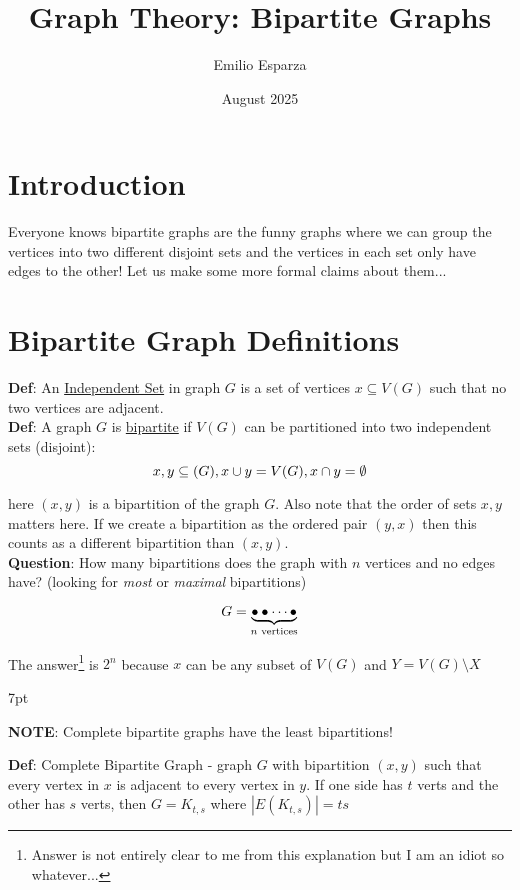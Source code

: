 \documentclass{article}
\title{Graph Theory: Bipartite Graphs}
\author{Emilio Esparza}
\date{August 2025}
\newenvironment{formal}{%
  \def\FrameCommand{%
    \hspace{1pt}%
    {\color{black}\vrule width 2pt}%
    {\color{formalshade}\vrule width 4pt}%
    \colorbox{formalshade}%
  }%
  \MakeFramed{\advance\hsize-\width\FrameRestore}%
  \noindent\hspace{-4.55pt}%
  \begin{adjustwidth}{}{7pt}%
  \vspace{2pt}\vspace{2pt}%
}
{%
  \vspace{2pt}\end{adjustwidth}\endMakeFramed%
}
\begin{document}
\maketitle

\section{Introduction}
Everyone knows bipartite graphs are the funny graphs where we can group the vertices into two different disjoint sets and the vertices in each set only have edges to the other! Let us make some more formal claims about them...

\section{Bipartite Graph Definitions}

\textbf{Def}: An \underline{Independent Set} in graph $G$ is a set of vertices $x \subseteq V(G)$ such that no two vertices are adjacent. \\

\noindent\textbf{Def}: A graph $G$ is \underline{bipartite} if $V(G)$ can be partitioned into two independent sets (disjoint):
$$x,y \subseteq (G), \space x \cup y = V(G), \space x \cap y = \emptyset$$

\noindent here $(x,y)$ is a bipartition of the graph $G$. Also note that the order of sets $x, y$ matters here. If we create a bipartition as the ordered pair $(y, x)$ then this counts as a different bipartition than $(x, y)$. \\


\noindent\textbf{Question}: How many bipartitions does the graph with $n$ vertices and no edges have? (looking for \emph{most} or \emph{maximal} bipartitions)

$$G = \underbrace{\bullet \space \bullet \dots \bullet}_{n\text{ vertices}}$$

The answer\footnote{Answer is not entirely clear to me from this explanation but I am an idiot so whatever...} is $2^n$ because $x$ can be any subset of $V(G)$ and $Y = V(G) \setminus X$

\begin{formal}
    \textbf{NOTE}: Complete bipartite graphs have the least bipartitions!
\end{formal}

\noindent\textbf{Def}: Complete Bipartite Graph - graph $G$ with bipartition $(x, y)$ such that every vertex in $x$ is adjacent to every vertex in $y$.
\noindent If one side has $t$ verts and the other has $s$ verts, then $G = K_{t,s}$ where $|E(K_{t,s})| = ts$ \\
\end{document}
